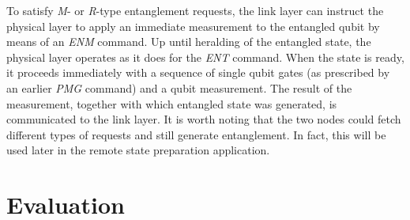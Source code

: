 To satisfy \emph{M}- or \emph{R}-type entanglement requests, the link layer can instruct the
physical layer to apply an immediate measurement to the entangled qubit by means of an \emph{ENM}
command. Up until heralding of the entangled state, the physical layer operates as it does for the
\emph{ENT} command. When the state is ready, it proceeds immediately with a sequence of single qubit
gates (as prescribed by an earlier \emph{PMG} command) and a qubit measurement. The result of the
measurement, together with which entangled state was generated, is communicated to the link layer.
It is worth noting that the two nodes could fetch different types of requests and still generate
entanglement. In fact, this will be used later in the remote state preparation application.

\section{Evaluation}
\label{sec:netstack:eval}

